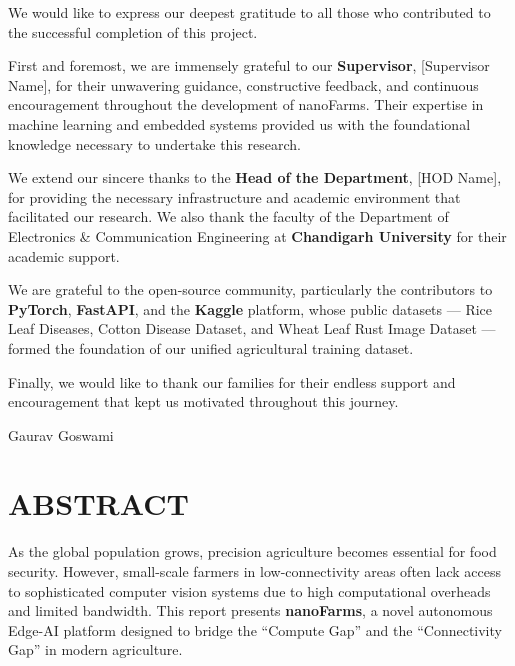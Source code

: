 \documentclass[12pt,oneside]{report}
\begin{document}
We would like to express our deepest gratitude to all those who contributed to the successful completion of this project.

First and foremost, we are immensely grateful to our \textbf{Supervisor}, [Supervisor Name], for their unwavering guidance, constructive feedback, and continuous encouragement throughout the development of nanoFarms. Their expertise in machine learning and embedded systems provided us with the foundational knowledge necessary to undertake this research.

We extend our sincere thanks to the \textbf{Head of the Department}, [HOD Name], for providing the necessary infrastructure and academic environment that facilitated our research. We also thank the faculty of the Department of Electronics \& Communication Engineering at \textbf{Chandigarh University} for their academic support.

We are grateful to the open-source community, particularly the contributors to \textbf{PyTorch}, \textbf{FastAPI}, and the \textbf{Kaggle} platform, whose public datasets — Rice Leaf Diseases, Cotton Disease Dataset, and Wheat Leaf Rust Image Dataset — formed the foundation of our unified agricultural training dataset.

Finally, we would like to thank our families for their endless support and encouragement that kept us motivated throughout this journey.

\vspace{1cm}
\begin{flushright}
Gaurav Goswami\\
[Co-Author Name]
\end{flushright}

\clearpage

\tableofcontents
\clearpage

\listoffigures
\clearpage

\listoftables
\clearpage

\chapter*{ABSTRACT}
\fontsize{14}{17}\selectfont

As the global population grows, precision agriculture becomes essential for food security. However, small-scale farmers in low-connectivity areas often lack access to sophisticated computer vision systems due to high computational overheads and limited bandwidth. This report presents \textbf{nanoFarms}, a novel autonomous Edge-AI platform designed to bridge the ``Compute Gap'' and the ``Connectivity Gap'' in modern agriculture.
\end{document}
